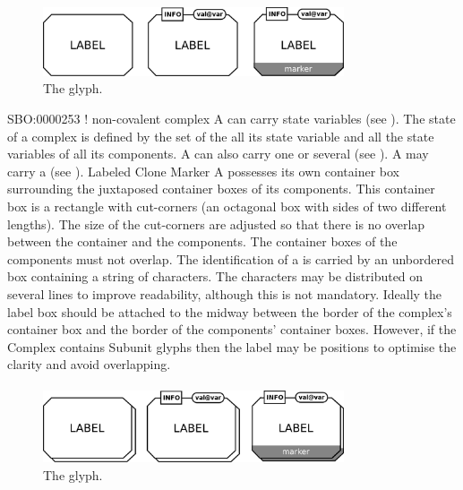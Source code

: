 \begin{figure}[H]
  \centering
  \includegraphics[width=3.5in]{images/complexGlyph}
  \caption{The  glyph.}
  \label{fig:complex}
\end{figure}

\begin{glyphDescription}
\glyphSboTerm SBO:0000253 ! non-covalent complex
\glyphAux A  can carry state variables (see ).  The state of a complex is defined by the set of the all its state variable and all the state variables of all its components.  A  can also carry one or several  (see ). A  may carry a  (see ).
\glyphCloning Labeled Clone Marker
\glyphContainer A  possesses its own container box surrounding the juxtaposed container boxes of its components.  This container box is a rectangle with cut-corners (an octagonal box with sides of two different lengths).  The size of the cut-corners are adjusted so that there is no overlap between the container and the components.  The container boxes of the components must not overlap.
\glyphLabel The identification of a  is carried
by an unbordered box containing a string of characters.  The
characters may be distributed on several lines to improve readability,
although this is not mandatory.  Ideally the label box should be
attached to the midway between the border of the complex's container
box and the border of the components' container boxes. However, if the
Complex contains Subunit glyphs then the label may be positions to
optimise the clarity and avoid overlapping.
\end{glyphDescription}


\paragraph{}

\begin{figure}[H]
  \centering
  \includegraphics[width = 3.5in]{images/complexMultimerGlyph}
  \caption{The  glyph.}
  \label{fig:complexMultimer}
\end{figure}

